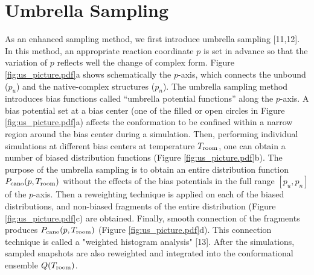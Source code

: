 \section{Umbrella Sampling}
As an enhanced sampling method, we first introduce umbrella sampling [11,12]. In this method, an appropriate reaction coordinate $p$ is set in advance so that the variation of $p$ reflects well the change of complex form. Figure \ref{fig:us_picture.pdf}a shows schematically the $p$-axis, which connects the unbound ($p_u$) and the native-complex structures ($p_n$). The umbrella sampling method introduces bias functions called “umbrella potential functions” along the $p$-axis. A bias potential set at a bias center (one of the filled or open circles in Figure \ref{fig:us_picture.pdf}a) affects the conformation to be confined within a narrow region around the bias center during a simulation. Then, performing individual simulations at different bias centers at temperature $T_{\rm room}$, one can obtain a number of biased distribution functions (Figure \ref{fig:us_picture.pdf}b). The purpose of the umbrella sampling is to obtain an entire distribution function $P_{\rm cano}(p, T_{\rm room})$ without the effects of the bias potentials in the full range $[p_u,p_n]$ of the $p$-axis. Then a reweighting technique is applied on each of the biased distributions, and non-biased fragments of the entire distribution (Figure \ref{fig:us_picture.pdf}c) are obtained. Finally, smooth connection of the fragments produces $P_{\rm cano}(p, T_{\rm room})$ (Figure \ref{fig:us_picture.pdf}d). This connection technique is called a "weighted histogram analysis" [13]. After the simulations, sampled snapshots are also reweighted and integrated into the conformational ensemble $Q(T_{\rm room})$. 
